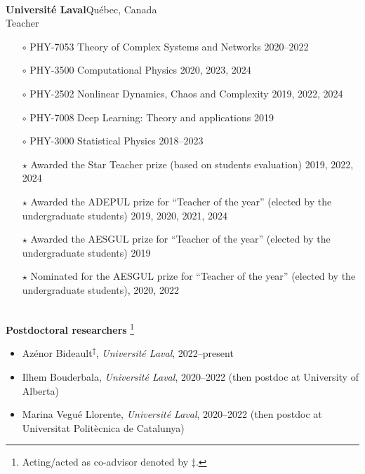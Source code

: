 \documentclass[11pt]{article}
\newcommand{\TitreSection}[1]{\colorbox{background}{\makebox[\textwidth-0.5em][c]{\Large\textrm{\textsc{#1}}}}\vspace{0.75\baselineskip}\\}
\begin{document}
%
%
%
%
%
\TitreSection{Teaching}
%
\textbf{Universit\'e Laval}\hfill Qu\'ebec, Canada\\
Teacher
\begin{itemize}[leftmargin=1.5em]\small
  \item[$\circ$] PHY-7053 Theory of Complex Systems and Networks \hfill 2020--2022%
  \item[$\circ$] PHY-3500 Computational Physics \hfill 2020, 2023, 2024%
  \item[$\circ$] PHY-2502 Nonlinear Dynamics, Chaos and Complexity \hfill 2019, 2022, 2024%
  \item[$\circ$] PHY-7008 Deep Learning: Theory and applications \hfill 2019%
  \item[$\circ$] PHY-3000 Statistical Physics \hfill 2018--2023%
  \item[$\star$] Awarded the Star Teacher prize (based on students evaluation) 2019, 2022, 2024
  \item[$\star$] Awarded the ADEPUL prize for ``Teacher of the year'' (elected by the undergraduate students) 2019, 2020, 2021, 2024
  \item[$\star$] Awarded the AESGUL prize for ``Teacher of the year'' (elected by the undergraduate students) 2019
  \item[$\star$] Nominated for the AESGUL prize for ``Teacher of the year'' (elected by the undergraduate students), 2020, 2022
\end{itemize} \vspace{0.75\baselineskip}
%
%
%
%
%
\pagebreak
\TitreSection{Mentoring}
%
\textbf{Postdoctoral researchers}%
%
\footnote{\label{foot:codirecteur}Acting/acted as co-advisor denoted by $\ddagger$.}
%
\begin{itemize}
  \item Azénor Bideault\textsuperscript{$\ddagger$}, \textit{Universit\'e Laval}, 2022--present
  \item Ilhem Bouderbala, \textit{Universit\'e Laval}, 2020--2022  {\small(then postdoc at University of Alberta)}
  \item Marina Vegué Llorente, \textit{Université Laval}, 2020--2022 {\small(then postdoc at Universitat Politècnica de Catalunya)}
\end{itemize}
\end{document}
